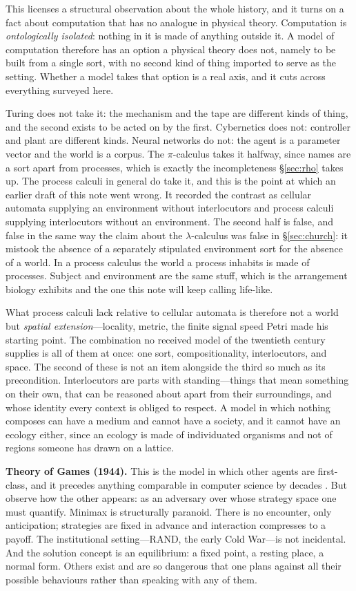 \documentclass[11pt,a4paper]{article}
\begin{document}
This licenses a structural observation about the whole history, and it turns on a
fact about computation that has no analogue in physical theory. Computation is
\emph{ontologically isolated}: nothing in it is made of anything outside it. A
model of computation therefore has an option a physical theory does not, namely to
be built from a single sort, with no second kind of thing imported to serve as the
setting. Whether a model takes that option is a real axis, and it cuts across
everything surveyed here.

Turing does not take it: the mechanism and the tape are different kinds of thing,
and the second exists to be acted on by the first. Cybernetics does not: controller
and plant are different kinds. Neural networks do not: the agent is a parameter
vector and the world is a corpus. The $\pi$-calculus takes it halfway, since names
are a sort apart from processes, which is exactly the incompleteness
\S\ref{sec:rho} takes up. The process calculi in general do take it, and this is
the point at which an earlier draft of this note went wrong. It recorded the
contrast as cellular automata supplying an environment without interlocutors and
process calculi supplying interlocutors without an environment. The second half is
false, and false in the same way the claim about the $\lambda$-calculus was false
in \S\ref{sec:church}: it mistook the absence of a separately stipulated
environment sort for the absence of a world. In a process calculus the world a
process inhabits is made of processes. Subject and environment are the same stuff,
which is the arrangement biology exhibits and the one this note will keep calling
life-like.

What process calculi lack relative to cellular automata is therefore not a world
but \emph{spatial extension}---locality, metric, the finite signal speed Petri
made his starting point. The combination no received model of the twentieth
century supplies is all of them at once: one sort, compositionality,
interlocutors, and space. The second of these is not an item alongside the third
so much as its precondition. Interlocutors are parts with standing---things that
mean something on their own, that can be reasoned about apart from their
surroundings, and whose identity every context is obliged to respect. A model in
which nothing composes can have a medium and cannot have a society, and it cannot
have an ecology either, since an ecology is made of individuated organisms and
not of regions someone has drawn on a lattice.

\textbf{Theory of Games (1944).} This is the model in which other agents are
first-class, and it precedes anything comparable in computer science by decades
\cite{vnm1944}. But observe how the other appears: as an adversary over whose
strategy space one must quantify. Minimax is structurally paranoid. There is no
encounter, only anticipation; strategies are fixed in advance and interaction
compresses to a payoff. The institutional setting---RAND, the early Cold
War---is not incidental. And the solution concept is an equilibrium: a fixed
point, a resting place, a normal form. Others exist and are so dangerous that one
plans against all their possible behaviours rather than speaking with any of them.
\end{document}
